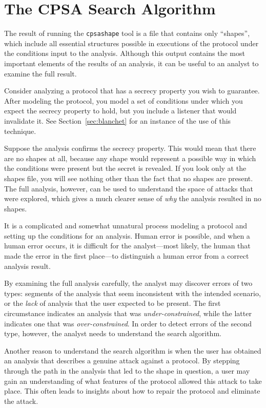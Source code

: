 \chapter{The CPSA Search Algorithm}
\label{ch:algorithm}

The result of running the \texttt{cpsashape} tool is a file that
contains only ``shapes'', which include all essential structures
possible in executions of the protocol under the conditions input to
the analysis.  Although this output contains the most important
elements of the results of an analysis, it can be useful to an analyst
to examine the full result.

Consider analyzing a protocol that has a secrecy property you wish to
guarantee.  After modeling the protocol, you model a set of conditions
under which you expect the secrecy property to hold, but you include a
listener that would invalidate it.  See Section~\ref{sec:blanchet} for
an instance of the use of this technique.

Suppose the analysis confirms the secrecy property.  This would mean
that there are no shapes at all, because any shape would represent a
possible way in which the conditions were present but the secret is
revealed.  If you look only at the shapes file, you will see nothing
other than the fact that no shapes are present.  The full analysis,
however, can be used to understand the space of attacks that were
explored, which gives a much clearer sense of \emph{why} the analysis
resulted in no shapes.

It is a complicated and somewhat unnatural process modeling a protocol
and setting up the conditions for an analysis.  Human error is
possible, and when a human error occurs, it is difficult for the
analyst---most likely, the human that made the error in the first
place---to distinguish a human error from a correct analysis result.

By examining the full analysis carefully, the analyst may discover
errors of two types: segments of the analysis that seem inconsistent
with the intended scenario, or the \emph{lack} of analysis that the
user expected to be present.  The first circumstance indicates an
analysis that was \emph{under-constrained}, while the latter indicates
one that was \emph{over-constrained}.  In order to detect errors of
the second type, however, the analyst needs to understand the search
algorithm.

Another reason to understand the search algorithm is when the user has
obtained an analysis that describes a genuine attack against a
protocol.  By stepping through the path in the analysis that led to
the shape in question, a user may gain an understanding of what
features of the protocol allowed this attack to take place. This often
leads to insights about how to repair the protocol and eliminate the
attack.

